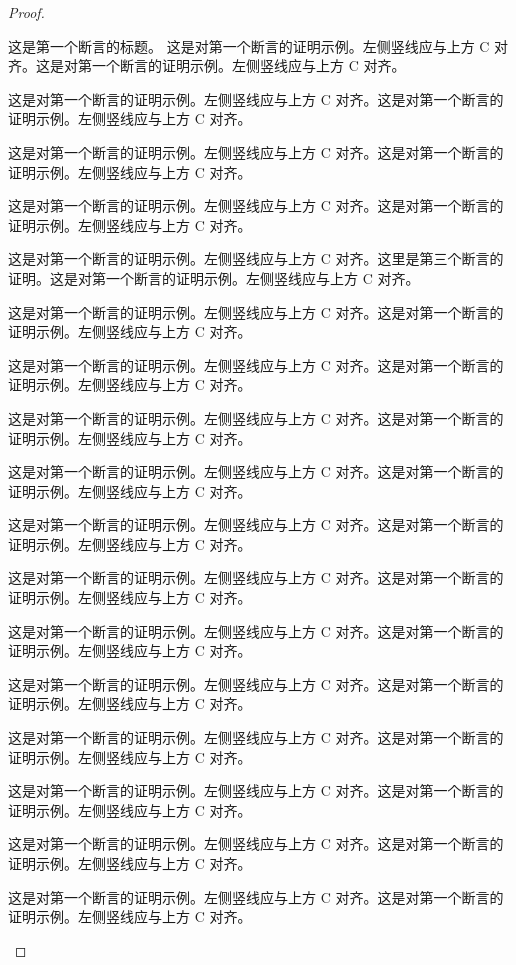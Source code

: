 \documentclass[lang=cn,a4paper,11pt,openany,scheme=chinese,twoside]{elegantbook}
\begin{document}
\begin{proof}
\begin{claim}{这是第一个断言的标题。}
这是对第一个断言的证明示例。左侧竖线应与上方 C 对齐。这是对第一个断言的证明示例。左侧竖线应与上方 C 对齐。 \par
这是对第一个断言的证明示例。左侧竖线应与上方 C 对齐。这是对第一个断言的证明示例。左侧竖线应与上方 C 对齐。 \par
这是对第一个断言的证明示例。左侧竖线应与上方 C 对齐。这是对第一个断言的证明示例。左侧竖线应与上方 C 对齐。 \par
这是对第一个断言的证明示例。左侧竖线应与上方 C 对齐。这是对第一个断言的证明示例。左侧竖线应与上方 C 对齐。 \par
这是对第一个断言的证明示例。左侧竖线应与上方 C 对齐。这里是第三个断言的证明。这是对第一个断言的证明示例。左侧竖线应与上方 C 对齐。 \par
这是对第一个断言的证明示例。左侧竖线应与上方 C 对齐。这是对第一个断言的证明示例。左侧竖线应与上方 C 对齐。 \par
这是对第一个断言的证明示例。左侧竖线应与上方 C 对齐。这是对第一个断言的证明示例。左侧竖线应与上方 C 对齐。 \par
这是对第一个断言的证明示例。左侧竖线应与上方 C 对齐。这是对第一个断言的证明示例。左侧竖线应与上方 C 对齐。 \par
这是对第一个断言的证明示例。左侧竖线应与上方 C 对齐。这是对第一个断言的证明示例。左侧竖线应与上方 C 对齐。 \par
这是对第一个断言的证明示例。左侧竖线应与上方 C 对齐。这是对第一个断言的证明示例。左侧竖线应与上方 C 对齐。 \par
这是对第一个断言的证明示例。左侧竖线应与上方 C 对齐。这是对第一个断言的证明示例。左侧竖线应与上方 C 对齐。 \par
这是对第一个断言的证明示例。左侧竖线应与上方 C 对齐。这是对第一个断言的证明示例。左侧竖线应与上方 C 对齐。 \par
这是对第一个断言的证明示例。左侧竖线应与上方 C 对齐。这是对第一个断言的证明示例。左侧竖线应与上方 C 对齐。 \par
这是对第一个断言的证明示例。左侧竖线应与上方 C 对齐。这是对第一个断言的证明示例。左侧竖线应与上方 C 对齐。 \par
这是对第一个断言的证明示例。左侧竖线应与上方 C 对齐。这是对第一个断言的证明示例。左侧竖线应与上方 C 对齐。 \par
这是对第一个断言的证明示例。左侧竖线应与上方 C 对齐。这是对第一个断言的证明示例。左侧竖线应与上方 C 对齐。 \par
这是对第一个断言的证明示例。左侧竖线应与上方 C 对齐。这是对第一个断言的证明示例。左侧竖线应与上方 C 对齐。 \par

\end{claim}
\end{proof}
\end{document}
